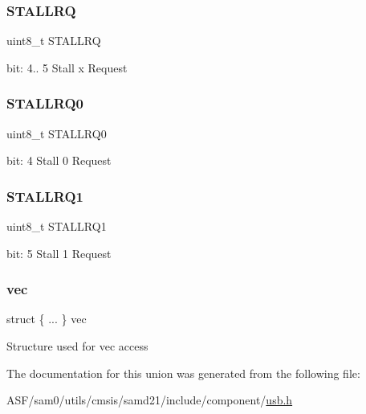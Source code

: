 \subsubsection{\texorpdfstring{STALLRQ}{STALLRQ}}
{\footnotesize\ttfamily uint8\+\_\+t S\+T\+A\+L\+L\+RQ}

bit\+: 4.. 5 Stall x Request \mbox{\label{union_u_s_b___d_e_v_i_c_e___e_p_s_t_a_t_u_s___type_a1b62d73ab84a16453cfe76dbae8e652c}} 
\subsubsection{\texorpdfstring{STALLRQ0}{STALLRQ0}}
{\footnotesize\ttfamily uint8\+\_\+t S\+T\+A\+L\+L\+R\+Q0}

bit\+: 4 Stall 0 Request \mbox{\label{union_u_s_b___d_e_v_i_c_e___e_p_s_t_a_t_u_s___type_aff69880ca0480a1518048272fd4b415c}} 
\subsubsection{\texorpdfstring{STALLRQ1}{STALLRQ1}}
{\footnotesize\ttfamily uint8\+\_\+t S\+T\+A\+L\+L\+R\+Q1}

bit\+: 5 Stall 1 Request \mbox{\label{union_u_s_b___d_e_v_i_c_e___e_p_s_t_a_t_u_s___type_a2ccabaa5821e4aa352c18fccf3207333}} 
\subsubsection{\texorpdfstring{vec}{vec}}
{\footnotesize\ttfamily struct \{ ... \}   vec}

Structure used for vec access 

The documentation for this union was generated from the following file\+:\begin{DoxyCompactItemize}
\item 
A\+S\+F/sam0/utils/cmsis/samd21/include/component/\mbox{\hyperlink{component_2usb_8h}{usb.\+h}}\end{DoxyCompactItemize}
